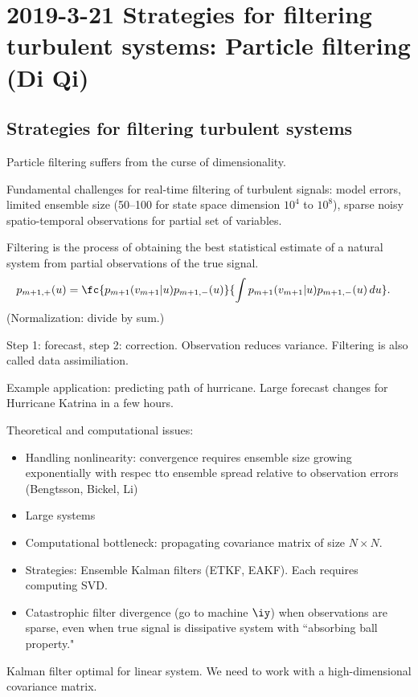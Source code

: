 \section{2019-3-21 Strategies for filtering turbulent systems: Particle filtering (Di Qi)}

\subsection{Strategies for filtering turbulent systems}

Particle filtering suffers from the curse of dimensionality.

Fundamental challenges for real-time filtering of turbulent signals: model errors, limited ensemble size (50--100 for state space dimension $10^4$ to $10^8$), sparse noisy spatio-temporal observations for partial set of variables.

Filtering is the process of obtaining the best statistical estimate of a natural system from partial observations of the true signal. 
\begin{align}p_{m+1,+}(u) &= \fc{p_{m+1}(v_{m+1}|u)p_{m+1,-}(u)}{\int p_{m+1}(v_{m+1}|u)p_{m+1,-}(u)\,du}.\end{align}
(Normalization: divide by sum.)

Step 1: forecast, step 2: correction. Observation reduces variance. Filtering is also called data assimiliation.

Example application: predicting path of hurricane. Large forecast changes for Hurricane Katrina in a few hours.

Theoretical and computational issues:
\begin{itemize}
\item
Handling nonlinearity: convergence requires ensemble size growing exponentially with respec tto ensemble spread relative to observation errors  (Bengtsson, Bickel, Li)
\item
Large systems
\item
Computational bottleneck: propagating covariance matrix of size $N\times N$.
\item
Strategies: Ensemble Kalman filters (ETKF, EAKF). Each requires computing SVD.
\item
Catastrophic filter divergence (go to machine $\iy$) when observations are sparse, even when true signal is dissipative system with ``absorbing ball property."
\end{itemize}
Kalman filter optimal for linear system. We need to work with a high-dimensional covariance matrix.

